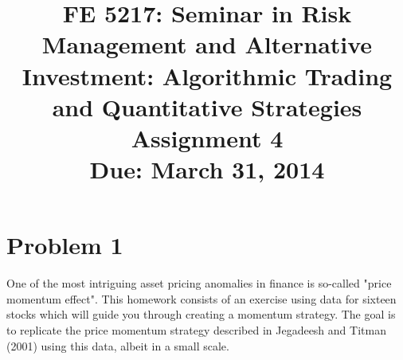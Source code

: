 \documentclass[11pt]{article}
\title{FE 5217: Seminar in Risk Management and Alternative Investment: Algorithmic Trading and Quantitative Strategies\\\vspace{5mm}Assignment 4\\\vspace{10mm}Due: March 31, 2014}
\date{}
\begin{document}
\maketitle


\vspace{5mm}
%

%
\section{Problem 1}
One of the most intriguing asset pricing anomalies in finance is so-called "price momentum effect". This homework consists of an exercise using data for sixteen stocks which will guide you through creating a momentum strategy. The goal is to replicate the price momentum strategy described in Jegadeesh and Titman (2001) using this data, albeit in a small scale.
\end{document}
